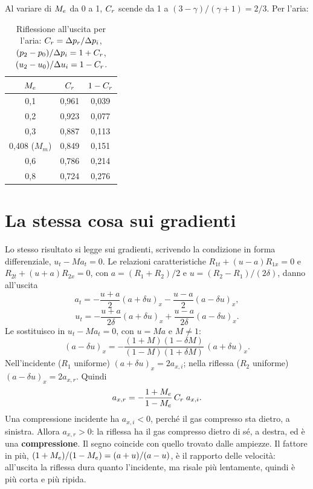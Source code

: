 Al variare di $M_e$ da 0 a 1, $C_r$ scende da 1 a $(3-\gamma)/(\gamma+1)=2/3$. Per l'aria:
\begin{table}[H]
  \centering
  \begin{tabular}{ccc}
    \toprule
    $M_e$ & $C_r$ & $1-C_r$ \\
    \midrule
    0,1 & 0,961 & 0,039 \\
    0,2 & 0,923 & 0,077 \\
    0,3 & 0,887 & 0,113 \\
    0,408 ($M_m$) & 0,849 & 0,151 \\
    0,6 & 0,786 & 0,214 \\
    0,8 & 0,724 & 0,276 \\
    \bottomrule
  \end{tabular}
  \caption{Riflessione all'uscita per l'aria: $C_r=\Delta p_r/\Delta p_i$, $(p_2-p_0)/\Delta p_i=1+C_r$,
  $(u_2-u_0)/\Delta u_i=1-C_r$.}
\end{table}

\section*{La stessa cosa sui gradienti}
Lo stesso risultato si legge sui gradienti, scrivendo la condizione in forma differenziale, $u_t-M a_t=0$. Le
relazioni caratteristiche $R_{1t}+(u-a)R_{1x}=0$ e $R_{2t}+(u+a)R_{2x}=0$, con $a=(R_1+R_2)/2$ e
$u=(R_2-R_1)/(2\delta)$, danno all'uscita
\[
  a_t=-\frac{u+a}{2}(a+\delta u)_x-\frac{u-a}{2}(a-\delta u)_x,
\]
\[
  u_t=-\frac{u+a}{2\delta}(a+\delta u)_x+\frac{u-a}{2\delta}(a-\delta u)_x .
\]
Le sostituisco in $u_t-Ma_t=0$, con $u=Ma$ e $M\neq1$:
\[
  (a-\delta u)_x=-\frac{(1+M)(1-\delta M)}{(1-M)(1+\delta M)}\,(a+\delta u)_x .
\]
Nell'incidente ($R_1$ uniforme) $(a+\delta u)_x=2a_{x,i}$; nella riflessa ($R_2$ uniforme) $(a-\delta u)_x=2a_{x,r}$.
Quindi
\[
  a_{x,r}=-\frac{1+M_e}{1-M_e}\,C_r\;a_{x,i}.
\]
Una compressione incidente ha $a_{x,i}<0$, perché il gas compresso sta dietro, a sinistra. Allora $a_{x,r}>0$: la
riflessa ha il gas compresso dietro di sé, a destra, ed è una \textbf{compressione}. Il segno coincide con quello
trovato dalle ampiezze. Il fattore in più, $(1+M_e)/(1-M_e)=(a+u)/(a-u)$, è il rapporto delle velocità: all'uscita la
riflessa dura quanto l'incidente, ma risale più lentamente, quindi è più corta e più ripida.


